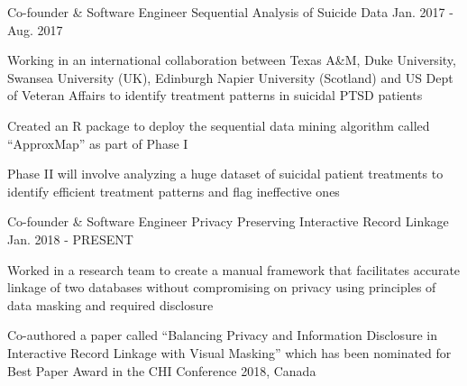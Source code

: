 

\begin{cventries}

  \cventry
    {Co-founder \& Software Engineer} %
    {Sequential Analysis of Suicide Data} %
    {Jan. 2017 - Aug. 2017} %
    {} %
    {
      \begin{cvitems} %
        \item {Working in an international collaboration between Texas A\&M, Duke University, Swansea University (UK), Edinburgh Napier University (Scotland) and US Dept of Veteran Affairs to identify treatment patterns in suicidal PTSD patients}
        \item {Created an R package to deploy the sequential data mining algorithm called “ApproxMap” as part of Phase I}
        \item {Phase II will involve analyzing a huge dataset of suicidal patient treatments to identify efficient treatment patterns and flag ineffective ones}
      \end{cvitems}
    }


  \cventry
    {Co-founder \& Software Engineer} %
    {Privacy Preserving Interactive Record Linkage} %
    {Jan. 2018 - PRESENT} %
    {} %
    {
      \begin{cvitems} %
        \item {Worked in a research team to create a manual framework that facilitates accurate linkage of two databases without compromising on privacy using principles of data masking and required disclosure}
        \item {Co-authored a paper called “Balancing Privacy and Information Disclosure in Interactive Record Linkage with Visual Masking” which has been nominated for Best Paper Award in the CHI Conference 2018, Canada}
      \end{cvitems}
    }


\end{cventries}
